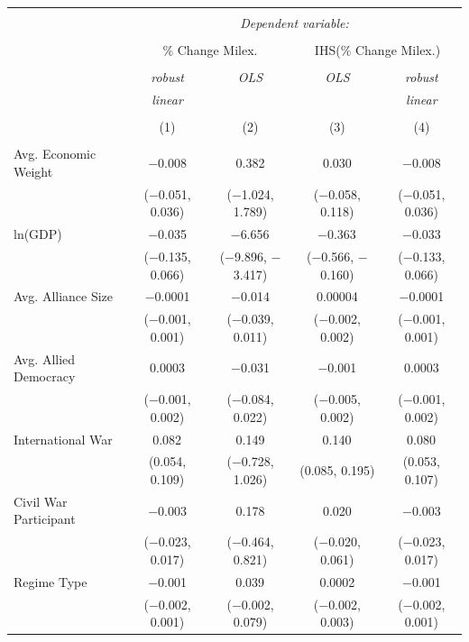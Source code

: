 \documentclass[12pt]{article}
\begin{document}
\begin{table}[!htbp] \centering 
\begin{tabular}{@{\extracolsep{0pt}}lcccc} 
\\[-1.8ex]\hline 
\hline \\[-1.8ex] 
 & \multicolumn{4}{c}{\textit{Dependent variable:}} \\ 
\cline{2-5} 
\\[-1.8ex] & \multicolumn{2}{c}{\% Change Milex.} & \multicolumn{2}{c}{IHS(\% Change Milex.)} \\ 
\\[-1.8ex] & \textit{robust} & \textit{OLS} & \textit{OLS} & \textit{robust} \\ 
 & \textit{linear} & \textit{} & \textit{} & \textit{linear} \\ 
\\[-1.8ex] & (1) & (2) & (3) & (4)\\ 
\hline \\[-1.8ex] 
 Avg. Economic Weight & $-$0.008 & 0.382 & 0.030 & $-$0.008 \\ 
  & ($-$0.051, 0.036) & ($-$1.024, 1.789) & ($-$0.058, 0.118) & ($-$0.051, 0.036) \\ 
  ln(GDP) & $-$0.035 & $-$6.656$^{}$ & $-$0.363$^{}$ & $-$0.033 \\ 
  & ($-$0.135, 0.066) & ($-$9.896, $-$3.417) & ($-$0.566, $-$0.160) & ($-$0.133, 0.066) \\ 
  Avg. Alliance Size & $-$0.0001 & $-$0.014 & 0.00004 & $-$0.0001 \\ 
  & ($-$0.001, 0.001) & ($-$0.039, 0.011) & ($-$0.002, 0.002) & ($-$0.001, 0.001) \\ 
  Avg. Allied Democracy & 0.0003 & $-$0.031 & $-$0.001 & 0.0003 \\ 
  & ($-$0.001, 0.002) & ($-$0.084, 0.022) & ($-$0.005, 0.002) & ($-$0.001, 0.002) \\ 
  International War & 0.082$^{}$ & 0.149 & 0.140$^{}$ & 0.080$^{}$ \\ 
  & (0.054, 0.109) & ($-$0.728, 1.026) & (0.085, 0.195) & (0.053, 0.107) \\ 
  Civil War Participant & $-$0.003 & 0.178 & 0.020 & $-$0.003 \\ 
  & ($-$0.023, 0.017) & ($-$0.464, 0.821) & ($-$0.020, 0.061) & ($-$0.023, 0.017) \\ 
  Regime Type & $-$0.001 & 0.039$^{}$ & 0.0002 & $-$0.001 \\ 
  & ($-$0.002, 0.001) & ($-$0.002, 0.079) & ($-$0.002, 0.003) & ($-$0.002, 0.001) \\ 

\end{tabular}
\end{table}
\end{document}
